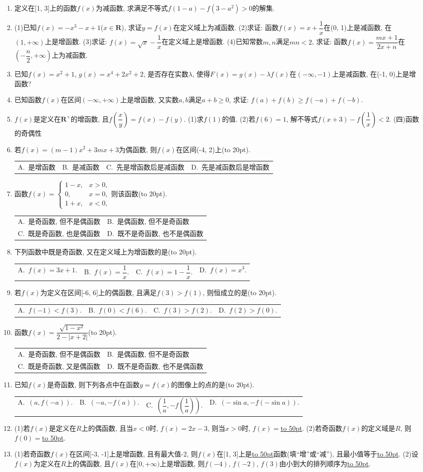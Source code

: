 \documentclass[10pt,a4paper]{article}
\newcommand{\blank}[1]{\underline{\hbox to #1pt{}}}
\newcommand{\bracket}[1]{(\hbox to #1pt{})}
\newcommand{\twoch}[4]{\par\begin{tabular}{p{.46\textwidth}p{.46\textwidth}}
A.~#1& B.~#2\\
C.~#3& D.~#4
\end{tabular}}
\newcommand{\fourch}[4]{\par\begin{tabular}{p{.23\textwidth}p{.23\textwidth}p{.23\textwidth}p{.23\textwidth}}
A.~#1 &B.~#2& C.~#3& D.~#4
\end{tabular}}
\begin{document}
\begin{enumerate}[1.]
\item 定义在[1, 3]上的函数$f(x)$为减函数, 求满足不等式$f(1-a)-f(3-a^2)>0$的解集.
\item (1)已知$f(x)=-x^3-x+1$($x\in \mathbf{R}$), 求证$y=f(x)$在定义域上为减函数.
(2)求证: 函数$f(x)=x+\dfrac 1x$在(0, 1)上是减函数, 在$(1,+\infty)$上是增函数.
(3)求证: $f(x)=\sqrt x-\dfrac 1x$在定义域上是增函数.
(4)已知常数$m,n$满足$mn<2$, 求证: 函数$f(x)=\dfrac{mx+1}{2x+n}$在$(-\dfrac n2,+\infty)$上为减函数.
\item 已知$f(x)=x^2+1$, $g(x)=x^4+2x^2+2$, 是否存在实数$\lambda$, 使得$F(x)=g(x)-\lambda f(x)$在$(-\infty ,-1)$上是减函数, 在(-1, 0)上是增函数?
\item 已知函数$f(x)$在区间$(-\infty ,+\infty)$上是增函数, 又实数$a,b$满足$a+b\ge 0$, 求证: $f(a)+f(b)\ge f(-a)+f(-b)$.
\item $f(x)$是定义在$\mathbf{R}^+$的增函数, 且$f(\dfrac xy)=f(x)-f(y)$.
(1)求$f(1)$的值.
(2)若$f(6)=1$, 解不等式$f(x+3)-f(\dfrac 1x)<2$.
(四)函数的奇偶性
\item 若$f(x)=(m-1)x^2+3mx+3$为偶函数, 则$f(x)$在区间(-4, 2)上\bracket{20}.
\fourch{是增函数}{是减函数}{先是增函数后是减函数}{先是减函数后是增函数}
\item 函数$f(x)=\begin{cases}   1-x, & x>0,  \\ 0, & x=0,  \\1+x, & x<0,  \end{cases}$则该函数\bracket{20}.
\twoch{是奇函数, 但不是偶函数}{是偶函数, 但不是奇函数}{既是奇函数, 也是偶函数}{既不是奇函数, 也不是偶函数}
\item 下列函数中既是奇函数, 又在定义域上为增函数的是\bracket{20}.
\fourch{$f(x)=3x+1.$}{$f(x)=\dfrac 1x.$}{$f(x)=1-\dfrac 1x.$}{$f(x)=x^3.$}
\item 若$f(x)$为定义在区间[-6, 6]上的偶函数, 且满足$f(3)>f(1)$, 则恒成立的是\bracket{20}.
\fourch{$f(-1)<f(3).$}{$f(0)<f(6).$}{$f(3)>f(2).$}{$f(2)>f(0).$}
\item 函数$f(x)=\dfrac{\sqrt {1-x^2}}{2-|x+2|}$\bracket{20}.
\twoch{是奇函数, 但不是偶函数}{是偶函数, 但不是奇函数}{既是奇函数, 又是偶函数}{既不是奇函数, 也不是偶函数}
\item 已知$f(x)$是奇函数, 则下列各点中在函数$y=f(x)$的图像上的点的是\bracket{20}.
\fourch{$(a,f(-a)).$}{$(-a,-f(a)).$}{$(\dfrac 1a,-f(\dfrac 1a)).$}{$(-\sin a,-f(-\sin a)).$}
\item (1)若$f(x)$是定义在$R$上的偶函数, 且当$x<0$时, $f(x)=2x-3$, 则当$x>0$时, $f(x)=$\blank{50}.
(2)若奇函数$f(x)$的定义域是$R$, 则$f(0)=$\blank{50}.
\item (1)若奇函数$f(x)$在区间[-3, -1]上是增函数, 且有最大值-2, 则$f(x)$在[1, 3]上是\blank{50}函数(填``增''或``减''), 且最小值等于\blank{50}.
(2)设$f(x)$为定义在$R$上的偶函数, 且$f(x)$在$[ 0,+\infty)$上是增函数, 则$f(-4)$, $f(-2)$, $f(3)$由小到大的排列顺序为\blank{50}.


\end{enumerate}
\end{document}

